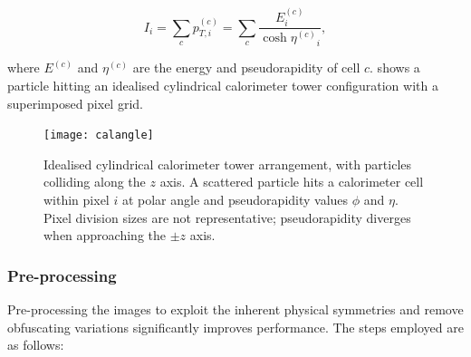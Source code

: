 \documentclass[twocolumn,twoside]{article}
\begin{document}
\begin{equation}
I_i = \sum_c p_{T, i}^{(c)} = \sum_c\frac{E^{(c)}_i}{\cosh{\eta^{(c)}}_i} ,
\label{eq:intensity}
\end{equation}

where $E^{(c)}$ and $\eta^{(c)}$ are the energy and pseudorapidity of cell $c$.  shows a particle hitting an idealised cylindrical calorimeter tower configuration with a superimposed pixel grid.

%	
%	

\begin{figure}[H]
	\centering
	\texttt{[image: calangle]}
	
	\caption{Idealised cylindrical calorimeter tower arrangement, with particles colliding along the $z$ axis. A scattered particle hits a calorimeter cell within pixel $i$ at polar angle and pseudorapidity values $\phi$ and $\eta$. Pixel division sizes are not representative; pseudorapidity diverges when approaching the $\pm z$ axis.}
	\label{fig:calangle}
	
\end{figure}

\subsubsection{Pre-processing}
\label{sec:preproc}

Pre-processing the images to exploit the inherent physical symmetries and remove obfuscating variations significantly improves performance. The steps employed are as follows:
\end{document}
